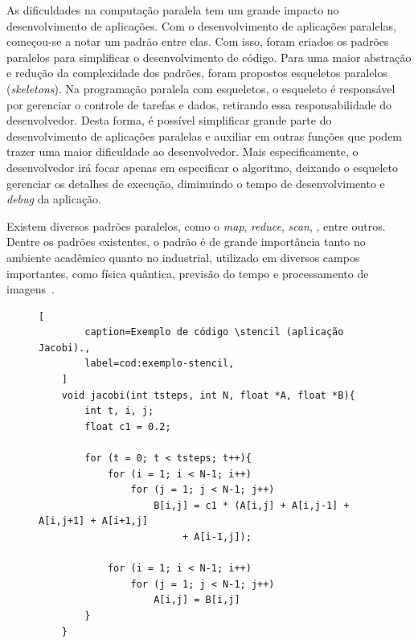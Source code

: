As dificuldades na computação paralela tem um grande impacto no desenvolvimento de aplicações. Com o
desenvolvimento de aplicações paralelas, começou-se a notar um padrão entre
elas. Com isso, foram criados os padrões paralelos para simplificar o
desenvolvimento de código.
Para uma maior abstração e redução da complexidade dos padrões, foram propostos
esqueletos paralelos (\textit{skeletons}). Na programação paralela com esqueletos, o esqueleto é responsável por
gerenciar o controle de tarefas e dados, retirando essa responsabilidade do
desenvolvedor. Desta forma, é possível simplificar grande parte do
desenvolvimento de aplicações paralelas e auxiliar em outras funções que podem
trazer uma maior dificuldade ao desenvolvedor. Mais especificamente, o
desenvolvedor irá focar apenas em especificar o algoritmo, deixando o esqueleto
gerenciar os detalhes de execução, diminuindo o tempo de desenvolvimento e
\textit{debug} da aplicação.

Existem diversos padrões paralelos, como o \textit{map}, \textit{reduce},
\textit{scan}, \stencil, entre outros. Dentre os padrões existentes, o
padrão \stencil é de grande importância tanto no ambiente acadêmico quanto no
industrial, utilizado em diversos campos importantes, como física quântica,
previsão do tempo e processamento de imagens~\cite{pereira15}.

\begin{figure}[t]
	\begin{lstlisting}[
		caption=Exemplo de código \stencil (aplicação Jacobi).,
		label=cod:exemplo-stencil,
	]
	void jacobi(int tsteps, int N, float *A, float *B){
		int t, i, j;
		float c1 = 0.2;

		for (t = 0; t < tsteps; t++){
			for (i = 1; i < N-1; i++)
				for (j = 1; j < N-1; j++)
					B[i,j] = c1 * (A[i,j] + A[i,j-1] + A[i,j+1] + A[i+1,j]
                         + A[i-1,j]);

			for (i = 1; i < N-1; i++)
				for (j = 1; j < N-1; j++)
					A[i,j] = B[i,j]
		}
	}
\end{lstlisting}
\end{figure}


